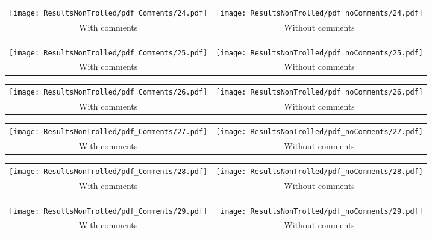 \begin{tabular}{cc}
{  \texttt{[image: ResultsNonTrolled/pdf\_Comments/24.pdf]} } & 
{  \texttt{[image: ResultsNonTrolled/pdf\_noComments/24.pdf]}} \\
 With comments & Without comments \\
\end{tabular}

\begin{tabular}{cc}
{  \texttt{[image: ResultsNonTrolled/pdf\_Comments/25.pdf]} } & 
{  \texttt{[image: ResultsNonTrolled/pdf\_noComments/25.pdf]}} \\
 With comments & Without comments \\
\end{tabular}

\begin{tabular}{cc}
{  \texttt{[image: ResultsNonTrolled/pdf\_Comments/26.pdf]} } & 
{  \texttt{[image: ResultsNonTrolled/pdf\_noComments/26.pdf]}} \\
 With comments & Without comments \\
\end{tabular}

\begin{tabular}{cc}
{  \texttt{[image: ResultsNonTrolled/pdf\_Comments/27.pdf]} } & 
{  \texttt{[image: ResultsNonTrolled/pdf\_noComments/27.pdf]}} \\
 With comments & Without comments \\
\end{tabular}

\begin{tabular}{cc}
{  \texttt{[image: ResultsNonTrolled/pdf\_Comments/28.pdf]} } & 
{  \texttt{[image: ResultsNonTrolled/pdf\_noComments/28.pdf]}} \\
 With comments & Without comments \\
\end{tabular}

\begin{tabular}{cc}
{  \texttt{[image: ResultsNonTrolled/pdf\_Comments/29.pdf]} } & 
{  \texttt{[image: ResultsNonTrolled/pdf\_noComments/29.pdf]}} \\
 With comments & Without comments \\
\end{tabular}

